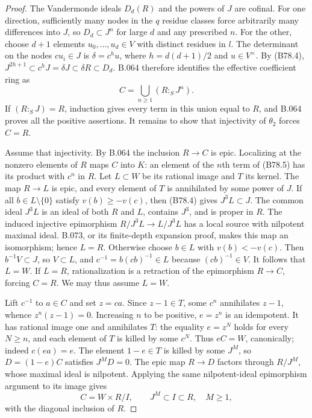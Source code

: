 \begin{proof}
The Vandermonde ideals $D_d(R)$ and the powers of $J$ are cofinal.
For one direction, sufficiently many nodes in the $q$ residue classes
force arbitrarily many differences into $J$, so $D_d\subset J^n$ for
large $d$ and any prescribed $n$. For the other, choose $d+1$ elements
$u_0,\ldots,u_d\in V$ with distinct residues in $l$. The determinant
on the nodes $cu_i\in J$ is $\delta=c^h u$, where
$h=d(d+1)/2$ and $u\in V^\times$. By (B78.4),
$J^{2h+1}\subset c^hJ=\delta J\subset\delta R\subset D_d$.
B.064 therefore identifies the effective coefficient ring as
\[
                         C=\bigcup_{n\ge1}(R:_S J^n).   \tag{B78.5}
\]
If $(R:_S J)=R$, induction gives every term in this union equal to $R$,
and B.064 proves all the positive assertions. It remains to show that
injectivity of $\theta_2$ forces $C=R$.

Assume that injectivity. By B.064 the inclusion $R\to C$ is epic.
Localizing at the nonzero elements of $R$ maps $C$ into $K$: an element
of the $n$th term of (B78.5) has its product with $c^n$ in $R$.
Let $L\subset W$ be its rational image and $T$ its kernel. The map
$R\to L$ is epic, and every element of $T$ is annihilated by some power
of $J$. If all $b\in L\setminus\{0\}$ satisfy $v(b)\ge-v(c)$, then
(B78.4) gives $J^3L\subset J$. The common ideal $J^3L$ is an ideal of
both $R$ and $L$, contains $J^3$, and is proper in $R$. The induced
injective epimorphism $R/J^3L\to L/J^3L$ has a local source with
nilpotent maximal ideal. B.073, or its finite-depth expansion proof,
makes this map an isomorphism; hence $L=R$.
Otherwise choose $b\in L$ with $v(b)<-v(c)$. Then $b^{-1}V\subset J$,
so $V\subset L$, and $c^{-1}=b(cb)^{-1}\in L$ because $(cb)^{-1}\in V$.
It follows that $L=W$. If $L=R$, rationalization is a retraction of
the epimorphism $R\to C$, forcing $C=R$. We may thus assume $L=W$.

Lift $c^{-1}$ to $a\in C$ and set $z=ca$. Since $z-1\in T$, some
$c^n$ annihilates $z-1$, whence $z^n(z-1)=0$. Increasing $n$ to be
positive, $e=z^n$ is an idempotent. It has rational image one and
annihilates $T$: the equality $e=z^N$ holds for every $N\ge n$, and
each element of $T$ is killed by some $c^N$. Thus $eC=W$, canonically;
indeed $c(ea)=e$. The element $1-e\in T$ is killed by some $J^M$, so
$D=(1-e)C$ satisfies $J^MD=0$. The epic map $R\to D$ factors through
$R/J^M$, whose maximal ideal is nilpotent. Applying the same
nilpotent-ideal epimorphism argument to its image gives
\[
                          C=W\times R/I,
             \qquad J^M\subset I\subset R,\quad M\ge1,  \tag{B78.6}
\]
with the diagonal inclusion of $R$.


\end{proof}
